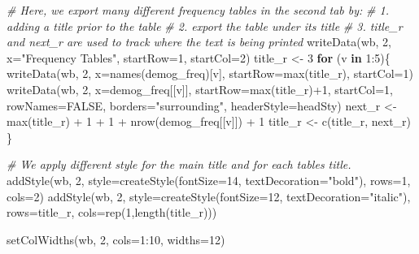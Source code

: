 \documentclass[
]{book}
\newenvironment{Shaded}{\begin{snugshade}}{\end{snugshade}}
\newcommand{\AttributeTok}[1]{\textcolor[rgb]{0.77,0.63,0.00}{#1}}
\newcommand{\CommentTok}[1]{\textcolor[rgb]{0.56,0.35,0.01}{\textit{#1}}}
\newcommand{\ConstantTok}[1]{\textcolor[rgb]{0.00,0.00,0.00}{#1}}
\newcommand{\ControlFlowTok}[1]{\textcolor[rgb]{0.13,0.29,0.53}{\textbf{#1}}}
\newcommand{\DecValTok}[1]{\textcolor[rgb]{0.00,0.00,0.81}{#1}}
\newcommand{\FunctionTok}[1]{\textcolor[rgb]{0.00,0.00,0.00}{#1}}
\newcommand{\NormalTok}[1]{#1}
\newcommand{\OtherTok}[1]{\textcolor[rgb]{0.56,0.35,0.01}{#1}}
\newcommand{\SpecialCharTok}[1]{\textcolor[rgb]{0.00,0.00,0.00}{#1}}
\newcommand{\StringTok}[1]{\textcolor[rgb]{0.31,0.60,0.02}{#1}}
\begin{document}
\begin{Shaded}
\begin{Highlighting}[]
\CommentTok{\# Here, we export many different frequency tables in the second tab by:}
\CommentTok{\# 1. adding a title prior to the table}
\CommentTok{\# 2. export the table under its title}
\CommentTok{\# 3. title\_r and next\_r are used to track where the text is being printed}
\FunctionTok{writeData}\NormalTok{(wb, }\DecValTok{2}\NormalTok{, }\AttributeTok{x=}\StringTok{"Frequency Tables"}\NormalTok{, }\AttributeTok{startRow=}\DecValTok{1}\NormalTok{, }\AttributeTok{startCol=}\DecValTok{2}\NormalTok{)}
\NormalTok{title\_r }\OtherTok{\textless{}{-}} \DecValTok{3}
\ControlFlowTok{for}\NormalTok{ (v }\ControlFlowTok{in} \DecValTok{1}\SpecialCharTok{:}\DecValTok{5}\NormalTok{)\{}
  \FunctionTok{writeData}\NormalTok{(wb, }\DecValTok{2}\NormalTok{, }\AttributeTok{x=}\FunctionTok{names}\NormalTok{(demog\_freq)[v], }\AttributeTok{startRow=}\FunctionTok{max}\NormalTok{(title\_r), }\AttributeTok{startCol=}\DecValTok{1}\NormalTok{)}
  \FunctionTok{writeData}\NormalTok{(wb, }\DecValTok{2}\NormalTok{, }\AttributeTok{x=}\NormalTok{demog\_freq[[v]], }\AttributeTok{startRow=}\FunctionTok{max}\NormalTok{(title\_r)}\SpecialCharTok{+}\DecValTok{1}\NormalTok{, }\AttributeTok{startCol=}\DecValTok{1}\NormalTok{, }
            \AttributeTok{rowNames=}\ConstantTok{FALSE}\NormalTok{, }\AttributeTok{borders=}\StringTok{"surrounding"}\NormalTok{, }\AttributeTok{headerStyle=}\NormalTok{headSty)}
\NormalTok{  next\_r }\OtherTok{\textless{}{-}} \FunctionTok{max}\NormalTok{(title\_r) }\SpecialCharTok{+} \DecValTok{1} \SpecialCharTok{+} \DecValTok{1} \SpecialCharTok{+} \FunctionTok{nrow}\NormalTok{(demog\_freq[[v]]) }\SpecialCharTok{+} \DecValTok{1}
\NormalTok{  title\_r }\OtherTok{\textless{}{-}} \FunctionTok{c}\NormalTok{(title\_r, next\_r)}
\NormalTok{\}}

\CommentTok{\# We apply different style for the main title and for each table\textquotesingle{}s title.}
\FunctionTok{addStyle}\NormalTok{(wb, }\DecValTok{2}\NormalTok{, }\AttributeTok{style=}\FunctionTok{createStyle}\NormalTok{(}\AttributeTok{fontSize=}\DecValTok{14}\NormalTok{, }\AttributeTok{textDecoration=}\StringTok{"bold"}\NormalTok{), }
         \AttributeTok{rows=}\DecValTok{1}\NormalTok{, }\AttributeTok{cols=}\DecValTok{2}\NormalTok{)}
\FunctionTok{addStyle}\NormalTok{(wb, }\DecValTok{2}\NormalTok{, }\AttributeTok{style=}\FunctionTok{createStyle}\NormalTok{(}\AttributeTok{fontSize=}\DecValTok{12}\NormalTok{, }\AttributeTok{textDecoration=}\StringTok{"italic"}\NormalTok{), }
         \AttributeTok{rows=}\NormalTok{title\_r, }\AttributeTok{cols=}\FunctionTok{rep}\NormalTok{(}\DecValTok{1}\NormalTok{,}\FunctionTok{length}\NormalTok{(title\_r)))}

\FunctionTok{setColWidths}\NormalTok{(wb, }\DecValTok{2}\NormalTok{, }\AttributeTok{cols=}\DecValTok{1}\SpecialCharTok{:}\DecValTok{10}\NormalTok{, }\AttributeTok{widths=}\DecValTok{12}\NormalTok{)}
\end{Highlighting}
\end{Shaded}
\end{document}
